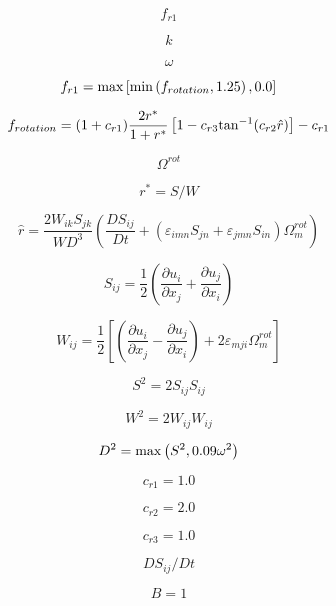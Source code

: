 

\begin{equation}
f_{r1}
\end{equation}

\begin{equation}
k
\end{equation}

\begin{equation}
\omega
\end{equation}

\begin{equation}
f_{r1} = {\rm max} \left[ {\rm min} \left( f_{rotation}, 1.25 \right),
   0.0 \right]
\end{equation}

\begin{equation}
f_{rotation} = (1 + c_{r1}) \frac{2r^*}{1+r^*}\left[ 1 -
   c_{r3} {\rm tan}^{-1}(c_{r2} \hat r)\right] - c_{r1}
\end{equation}

\begin{equation}
\Omega^{rot}
\end{equation}

\begin{equation}
r^* = S/W
\end{equation}

\begin{equation}
\hat r = \frac{2 W_{ik} S_{jk}}{W D^3} \left( \frac{DS_{ij}}{Dt} + (\varepsilon_{imn}S_{jn}
   +\varepsilon_{jmn}S_{in}) \Omega^{rot}_m \right)
\end{equation}

\begin{equation}
S_{ij} = \frac{1}{2} \left(\frac{\partial u_i}{\partial x_j} +
   \frac{\partial u_j}{\partial x_i} \right)
\end{equation}

\begin{equation}
W_{ij} = \frac{1}{2} \left[ \left(\frac{\partial u_i}{\partial x_j} -
   \frac{\partial u_j}{\partial x_i} \right) + 2 \varepsilon_{mji} \Omega^{rot}_m \right]
\end{equation}

\begin{equation}
S^2 = 2 S_{ij}S_{ij}
\end{equation}

\begin{equation}
W^2 = 2 W_{ij}W_{ij}
\end{equation}

\begin{equation}
D^2 = {\rm max} \left( S^2, 0.09 \omega^2 \right)
\end{equation}

\begin{equation}
c_{r1} = 1.0
\end{equation}

\begin{equation}
c_{r2} = 2.0
\end{equation}

\begin{equation}
c_{r3} = 1.0
\end{equation}

\begin{equation}
DS_{ij}/Dt
\end{equation}

\begin{equation}
B=1
\end{equation}



